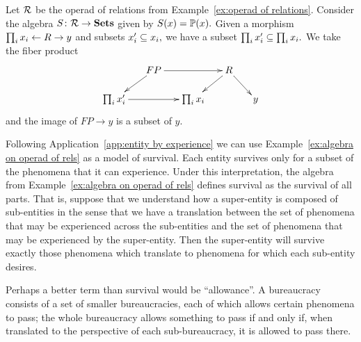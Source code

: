 \documentclass[CT4S-EN-RU]{subfiles}
\begin{document}
\begin{applicationRUS}\label{app:entity by experience}
\end{applicationRUS}

\begin{exampleENG}\label{ex:algebra on operad of rels}
Let $\mcR$ be the operad of relations from Example~\ref{ex:operad of relations}. Consider the algebra $S\taking\mcR\to\Sets$ given by $S(x)=\PP(x).$ Given a morphism $\prod_ix_i\from R\to y$ and subsets $x_i'\ss x_i,$ we have a subset $\prod_ix_i'\ss\prod_ix_i.$ We take the fiber product
$$\xymatrix@=15pt{&FP\ar[rr]\ar[ld]&&R\ar[ld]\ar[rd]\\\prod_ix_i'\ar[rr]&&\prod_ix_i&&y}$$
and the image of $FP\to y$ is a subset of $y.$ 
\end{exampleENG}

\begin{exampleRUS}\label{ex:algebra on operad of rels}
\end{exampleRUS}

\begin{applicationENG}\label{app:desire}
Following Application~\ref{app:entity by experience} we can use Example~\ref{ex:algebra on operad of rels} as a model of survival. Each entity survives only for a subset of the phenomena that it can experience. Under this interpretation, the algebra from Example~\ref{ex:algebra on operad of rels} defines survival as the survival of all parts. That is, suppose that we understand how a super-entity is composed of sub-entities in the sense that we have a translation between the set of phenomena that may be experienced across the sub-entities and the set of phenomena that may be experienced by the super-entity. Then the super-entity will survive exactly those phenomena which translate to phenomena for which each sub-entity desires. 

Perhaps a better term than survival would be “allowance”. A bureaucracy consists of a set of smaller bureaucracies, each of which allows certain phenomena to pass; the whole bureaucracy allows something to pass if and only if, when translated to the perspective of each sub-bureaucracy, it is allowed to pass there.
\end{applicationENG}

\begin{applicationRUS}\label{app:desire}
\end{applicationRUS}
\end{document}
